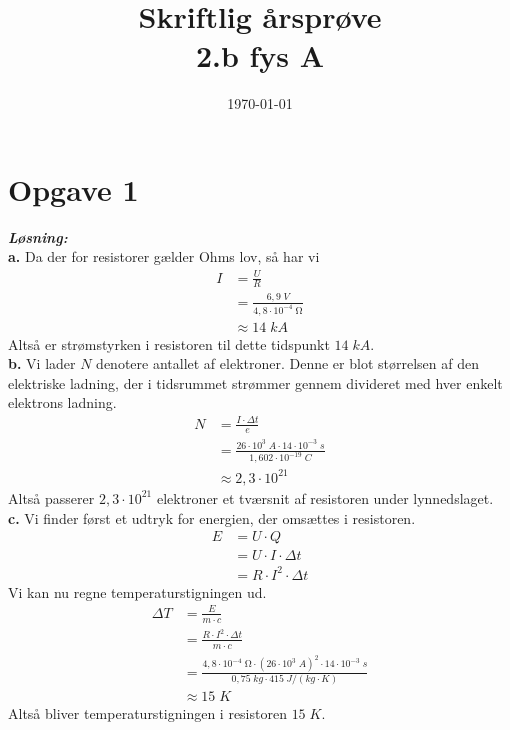 \documentclass{report}
\title{Skriftlig årsprøve\\
{\Large \textbf{2.b fys A}}}
\date{\today}
\newcommand{\sol}{\setlength{\parindent}{0cm}\textbf{\textit{Løsning:}}\setlength{\parindent}{1cm}}
\begin{document}
\maketitle
\section*{Opgave 1}
\sol \\
\textbf{a.}
Da der for resistorer gælder Ohms lov, så har vi 
\begin{equation*}
\begin{split}
  I&=\frac{U}{R}\\ 
  &=\frac{6,9 \;\unit{V} }{4,8 \cdot 10^{-4} \;\unit{\ohm} }\\ 
  &\approx 14 \;\unit{kA} 
\end{split}
\end{equation*}
Altså er strømstyrken i resistoren til dette tidspunkt $14 \;\unit{kA} $.\\[1ex]
\textbf{b.}
Vi lader $N$ denotere antallet af elektroner. 
Denne er blot størrelsen af den elektriske ladning, der i tidsrummet strømmer gennem divideret med hver enkelt elektrons ladning.
\begin{equation*}
\begin{split}
  N&=\frac{I \cdot \Delta t}{e}\\ 
  &=\frac{26 \cdot 10^3\;\unit{A} \cdot 14 \cdot 10^{-3} \;\unit{s} }{1,602 \cdot 10^{-19} \;\unit{C}}\\ 
  &\approx 2,3 \cdot 10^{21}
\end{split}
\end{equation*}
Altså passerer $2,3 \cdot 10^{21}$ elektroner et tværsnit af resistoren under lynnedslaget.\\[1ex]
\textbf{c.}
Vi finder først et udtryk for energien, der omsættes i resistoren.
\begin{equation*}
\begin{split}
  E&=U \cdot Q \\
  &=U \cdot I \cdot \Delta t\\ 
  &=R \cdot I^2 \cdot \Delta t
\end{split}
\end{equation*}
Vi kan nu regne temperaturstigningen ud.
\begin{equation*}
\begin{split}
  \Delta T&=\frac{E}{m \cdot c}\\ 
  &=\frac{R \cdot I^2 \cdot \Delta t}{m \cdot c}\\ 
  &=\frac{4,8 \cdot 10^{-4} \;\unit{\ohm} \cdot \left(26 \cdot 10^{3} \;\unit{A} \right)^2 \cdot 14 \cdot 10^{-3} \;\unit{s} }{0,75 \;\unit{kg} \cdot 415 \;\unit{J/(kg \cdot K)} }\\ 
  &\approx 15 \;\unit{K} 
\end{split}
\end{equation*}
Altså bliver temperaturstigningen i resistoren $15 \;\unit{K} $.
\end{document}
